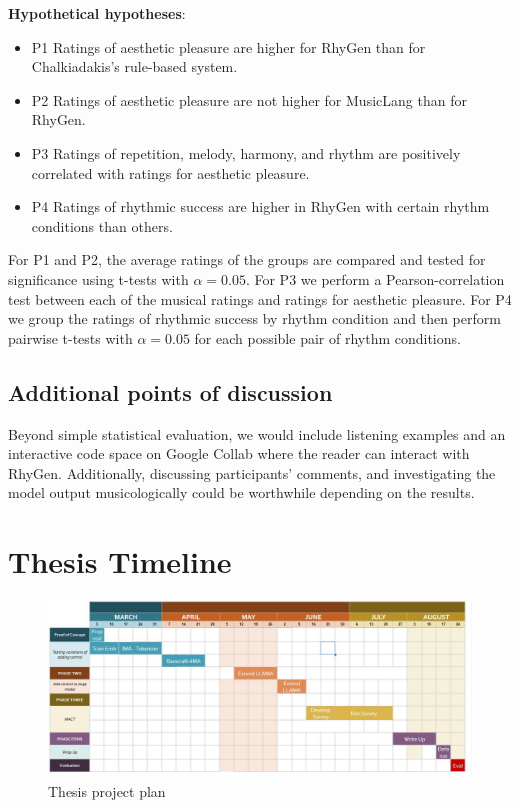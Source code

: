 \textbf{Hypothetical hypotheses}: 
\begin{itemize}
\item{P1} Ratings of aesthetic pleasure are higher for RhyGen than for Chalkiadakis's rule-based system.
\item{P2} Ratings of aesthetic pleasure are not higher for MusicLang than for RhyGen. 
\item{P3} Ratings of repetition, melody, harmony, and rhythm are positively correlated with ratings for aesthetic pleasure.
\item{P4} Ratings of rhythmic success are higher in RhyGen with certain rhythm conditions than others.
\end{itemize}

For P1 and P2, the average ratings of the groups are compared and tested for significance using t-tests with $\alpha=0.05$. 
For P3 we perform a Pearson-correlation test between each of the musical ratings and ratings for aesthetic pleasure.
For P4 we group the ratings of rhythmic success by rhythm condition and then perform pairwise t-tests with $\alpha=0.05$ for each possible pair of rhythm conditions. 


\subsection{Additional points of discussion}
Beyond simple statistical evaluation, we would include listening examples and an interactive code space on Google Collab where the reader can interact with RhyGen. Additionally, discussing participants' comments, and investigating the model output musicologically could be worthwhile depending on the results. 
\section{Thesis Timeline}

\begin{figure}[H]
    \centering
    \includegraphics[width=1\textwidth]{IMAGES/project_plan.jpg} 
    \caption{Thesis project plan}
    \label{fig:projectplan}
\end{figure}



